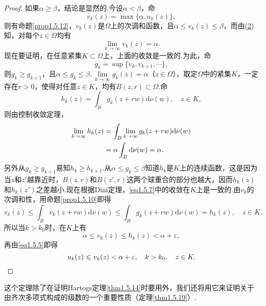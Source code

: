\begin{proof}
	如果$\alpha\ge\beta$，结论是显然的.今设$\alpha<\beta$，命
	\begin{equation}\label{eq1.5.5}
		v_k(z)=\max\{\alpha,u_k(z)\},
	\end{equation}
则有命题\ref{prop1.5.12}，$v_k(z)$是$\Omega$上的次调和函数，且$\alpha\le v_k(z)\le\beta$，而由\hyperlink{1.5.13}{(2)}知，对每个$z\in\Omega$均有
\begin{equation}\label{eq1.5.6}
	\lim\limits_{k\to\infty}v_k(z)=\alpha.
\end{equation}
现在要证明，在任意紧集$K\subset\Omega$上，上面的收敛是一致的.为此，命$$g_k=\sup\{v_k,v_{k+1},\cdots\},$$则$g_k\ge g_{k+1}$，且$\alpha\le g_k\le\beta,\lim\limits_{k\to\infty}g_k(z)=\alpha$（$z\in\Omega$），取定$\Omega$中的紧集$K$，一定存在$r>0$，使得对任意$z\in K$，均有$B(z,r)\subset\Omega$.命
\[h_k(z)=\int_{B}g_k(z+rw)\mathrm{d}\nu(w),\quad z\in K,\]
则由控制收敛定理，
\begin{align}\label{eq1.5.7}
	\lim_{k\to\infty} h_k(z)
	&=\int_{B}\lim_{k\to\infty}g_k(z+rw)\mathrm{d}\nu(w)\notag\\
	&=\alpha\int_{B}\mathrm{d}\nu(w)=\alpha.
\end{align}
另外从$g_k\ge g_{k+1}$易知$h_k\ge h_{k+1}$.从$\alpha\le g_k\le\beta$知道$h_k$是$K$上的连续函数，这是因为当$z$和$z'$越靠近时，$B(z,r)$和$B(z',r)$这两个球重合的部分也越大，因而$h_k(z)$和$h_k(z')$之差越小.现在根据Dini定理，\eqref{eq1.5.7}中的收敛在$K$上是一致的.由$v_k$的次调和性，用命题\ref{prop1.5.10}即得
\[v_k(z)\le\int_{B}v_k(z+rw)\mathrm{d}\nu(w)\le\int_{B}g_k(z+rw)\mathrm{d}\nu(w)=h_k(z),\quad z\in K.\]
所以当$k>k_0$时，在$K$上有
\[\alpha\le v_k(z)\le h_k(z)<\alpha+\varepsilon,\]
再由\eqref{eq1.5.5}即得
\[u_k(z)\le v_k(z)<\alpha+\varepsilon,\quad k>k_0,\quad z\in K.\qedhere\]
\end{proof}
这个定理除了在证明Hartogs定理\ref{thm1.5.14}时要用外，我们还将用它来证明关于由齐次多项式构成的级数的一个重要性质（定理\ref{thm1.5.19}）.
